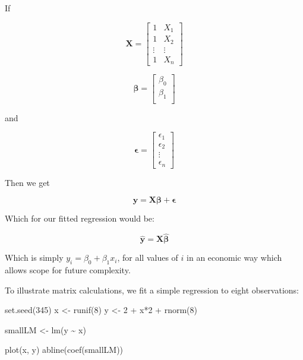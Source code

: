 \documentclass[
  oneside]{krantz}
\newenvironment{Shaded}{\begin{snugshade}}{\end{snugshade}}
\newcommand{\DecValTok}[1]{\textcolor[rgb]{0.00,0.00,0.81}{#1}}
\newcommand{\FunctionTok}[1]{\textcolor[rgb]{0.00,0.00,0.00}{#1}}
\newcommand{\NormalTok}[1]{#1}
\newcommand{\OtherTok}[1]{\textcolor[rgb]{0.56,0.35,0.01}{#1}}
\newcommand{\SpecialCharTok}[1]{\textcolor[rgb]{0.00,0.00,0.00}{#1}}
\begin{document}
If

\[
\mathbf{X} = 
\left[\begin{array}
{rr}
1 & X_1 \\
1 & X_2 \\  
\vdots & \vdots\\
1 & X_n
\end{array}\right] 
\]

\[
\mathbf{\beta} = 
\left[\begin{array}
{r}
\beta_0 \\
 \beta_1 \\  
\end{array}\right]
\]

and

\[
\mathbf{\epsilon} = 
\left[\begin{array}
{r}
\epsilon_1 \\
 \epsilon_2 \\  
\vdots \\
\epsilon_n
\end{array}\right]
\]

Then we get

\[ \mathbf{y} = \mathbf{X}\boldsymbol{\beta} + \mathbf{\epsilon}\]

Which for our fitted regression would be:

\[ \hat{\mathbf{y}} = \mathbf{X} \hat{\boldsymbol{\beta}} \]

Which is simply \(y_i = \beta_0 + \beta_1 x_i\), for all values of \(i\) in an economic way which allows scope for future complexity.

To illustrate matrix calculations, we fit a simple regression to eight observations:

\begin{Shaded}
\begin{Highlighting}[]
  \FunctionTok{set.seed}\NormalTok{(}\DecValTok{345}\NormalTok{)}
\NormalTok{  x }\OtherTok{\textless{}{-}} \FunctionTok{runif}\NormalTok{(}\DecValTok{8}\NormalTok{)}
\NormalTok{  y }\OtherTok{\textless{}{-}} \DecValTok{2} \SpecialCharTok{+}\NormalTok{ x}\SpecialCharTok{*}\DecValTok{2} \SpecialCharTok{+} \FunctionTok{rnorm}\NormalTok{(}\DecValTok{8}\NormalTok{)}
  
\NormalTok{  smallLM }\OtherTok{\textless{}{-}} \FunctionTok{lm}\NormalTok{(y }\SpecialCharTok{\textasciitilde{}}\NormalTok{ x)}

  \FunctionTok{plot}\NormalTok{(x, y)}
  \FunctionTok{abline}\NormalTok{(}\FunctionTok{coef}\NormalTok{(smallLM))}
\end{Highlighting}
\end{Shaded}
\end{document}
